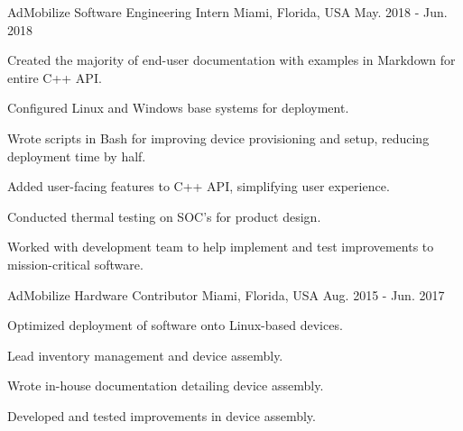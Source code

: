 \begin{cventries}

  \cventry
    {AdMobilize} %
    {Software Engineering Intern} %
    {Miami, Florida, USA} %
    {May. 2018 - Jun. 2018} %
    {
      \begin{cvitems} %
        \item {Created the majority of end-user documentation with examples  in Markdown for entire C++ API.}
        \item {Configured Linux and Windows base systems for deployment.}
        \item {Wrote scripts in Bash for improving device provisioning and setup, reducing deployment time by half.}
        \item {Added user-facing features to C++ API, simplifying user experience.}
        \item {Conducted thermal testing on SOC's for product design.}
        \item {Worked with development team to help implement and test improvements to mission-critical software.}
      \end{cvitems}
    }

  \cventry
    {AdMobilize} %
    {Hardware Contributor} %
    {Miami, Florida, USA} %
    {Aug. 2015 - Jun. 2017} %
    {
      \begin{cvitems} %
        \item {Optimized deployment of software onto Linux-based devices.}
        \item {Lead inventory management and device assembly.}
        \item {Wrote in-house documentation detailing device assembly.}
        \item {Developed and tested improvements in device assembly.}
      \end{cvitems}
    }

\end{cventries}